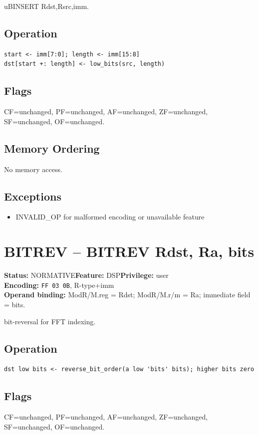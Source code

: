 \documentclass[10pt]{article}
\begin{document}
uBINSERT Rdst,Rsrc,imm.

\subsection*{Operation}
\begin{lstlisting}
start <- imm[7:0]; length <- imm[15:8]
dst[start +: length] <- low_bits(src, length)
\end{lstlisting}
\subsection*{Flags}
CF=unchanged, PF=unchanged, AF=unchanged, ZF=unchanged, SF=unchanged, OF=unchanged.
\subsection*{Memory Ordering}
No memory access.
\subsection*{Exceptions}
\begin{itemize}
\item INVALID\_OP for malformed encoding or unavailable feature
\end{itemize}
\clearpage

\section{BITREV -- BITREV Rdst, Ra, bits}
\textbf{Status:} NORMATIVE\quad \textbf{Feature:} DSP\quad \textbf{Privilege:} user\\
\textbf{Encoding:} \texttt{FF 03 0B}, R-type+imm\\
\textbf{Operand binding:} ModR/M.reg = Rdst; ModR/M.r/m = Ra; immediate field = bits.

bit-reversal for FFT indexing.

\subsection*{Operation}
\begin{lstlisting}
dst low bits <- reverse_bit_order(a low 'bits' bits); higher bits zero
\end{lstlisting}
\subsection*{Flags}
CF=unchanged, PF=unchanged, AF=unchanged, ZF=unchanged, SF=unchanged, OF=unchanged.
\end{document}
